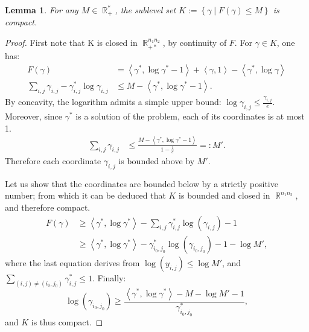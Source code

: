 \documentclass{article} %
\newcommand{\scal}[2]{\left\langle #1 , #2 \right\rangle}
\DeclareMathOperator{\IR}{\mathbb{R}}
\theoremstyle{plain}
\newtheorem{lemma}{Lemma}
\theoremstyle{definition}
\theoremstyle{remark}
\begin{document}
\begin{lemma} \label{lemma:KL_compact}
	For any $M \in \IR_+^*$, the sublevel set $K := \left\{ \gamma \mid F(\gamma) \le M \right\}$ is compact.
\end{lemma}
\begin{proof}
	First note that K is closed in $\IR_{+*}^{n_1 n_2}$, by continuity of $F$.
	For $\gamma \in K$, one has:
	\begin{align*}
	F(\gamma) &= \scal{\gamma^*}{\log \gamma^* - 1} + \scal{\gamma}{1} - \scal{\gamma^*}{\log \gamma}\\
	\sum_{i,j} \gamma_{i,j} - \gamma^*_{i,j} \log \gamma_{i,j} &\le M - \scal{\gamma^*}{\log \gamma^* - 1} .
	\end{align*}
	By concavity, the logarithm admits a simple upper bound: $\log \gamma_{i,j} \le \frac{\gamma_{i,j}}{e}$. Moreover, since $\gamma^*$ is a solution of the problem, each of its coordinates is at most 1.
	\begin{align*}
	\sum_{i,j} \gamma_{i,j} &\le \frac{M - \scal{\gamma^*}{\log \gamma^*-1}}{1-\frac{1}{e}} =: M'.
	\end{align*}
	Therefore each coordinate $\gamma_{i,j}$ is bounded above by $M'$.
	
	Let us show that the coordinates are bounded below by a strictly positive number; from which it can be deduced that $K$ is bounded and closed in $\IR^{n_1 n_2}$, and therefore compact.
	\begin{align*}
	F(\gamma)
	&\ge \scal{\gamma^*}{\log \gamma^*} - \sum_{i,j} \gamma^*_{i,j} \log(\gamma_{i,j}) - 1\\
	&\ge \scal{\gamma^*}{\log \gamma^*} - \gamma^*_{i_0,j_0} \log(\gamma_{i_0,j_0}) - 1 - \log M',
	\end{align*}
	where the last equation derives from $\log(y_{i,j}) \le \log M'$, and $\sum_{(i,j)\neq(i_0,j_0)} \gamma^*_{i,j} \le 1$.
	Finally:
	\[
	\log(\gamma_{i_0,j_0}) \ge \frac{\scal{\gamma^*}{\log \gamma^*} - M - \log M' - 1}{\gamma^*_{i_0,j_0}},
	\]
	and $K$ is thus compact.
\end{proof}
\end{document}
